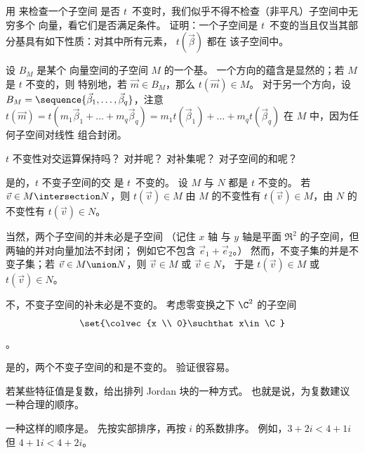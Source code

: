   \item 
    用  来检查一个子空间
    是否 $t$~不变时，我们似乎不得不检查（非平凡）子空间中无穷多个
    向量，看它们是否满足条件。
    证明：一个子空间是 \( t \)~不变的当且仅当其部分基具有如下性质：对其中所有元素，
    $t(\vec{\beta})$ 都在
    该子空间中。
    \begin{answer}
      设 \( B_M \) 是某个
      向量空间的子空间 \( M \) 的一个基。
      一个方向的蕴含是显然的；若 \( M \) 是 \( t \) 不变的，则
      特别地，若 \( \vec{m}\in B_M \)，那么 \( t(\vec{m})\in M \)。
      对于另一个方向，设
      \( B_M=\sequence{\vec{\beta}_1,\dots,\vec{\beta}_q} \)，注意
      \( t(\vec{m})=t(m_1\vec{\beta}_1+\dots+m_q\vec{\beta}_q)
                   =m_1t(\vec{\beta}_1)+\dots+m_qt(\vec{\beta}_q) \)
      在 \( M \) 中，因为任何子空间对线性
      组合封闭。 
    \end{answer}
  \recommended \item 
    \( t \) 不变性对交运算保持吗？
    对并呢？
    对补集呢？
    对子空间的和呢？
    \begin{answer}
      是的，$t$ 不变子空间的交
      是 $t$~不变的。
      设 \( M \) 与 \( N \) 都是 \( t \) 不变的。
      若 \( \vec{v}\in M\intersection N \)，则 \( t(\vec{v})\in M \) 
      由 \( M \) 的不变性有 \( t(\vec{v})\in M \)，由
      \( N \) 的不变性有 \( t(\vec{v})\in N \)。

      当然，两个子空间的并未必是子空间
      （记住 $x$ 轴\hbox{} 与 $y$ 轴是平面
      $\Re^2$ 的子空间，但两轴的并对向量加法不封闭；
      例如它不包含
      $\vec{e}_1+\vec{e}_2$。）
      然而，不变子集的并是不变子集；若
      \( \vec{v}\in M\union N \)，则 \( \vec{v}\in M \) 或 \( \vec{v}\in N \)，
      于是 \( t(\vec{v})\in M \) 或 \( t(\vec{v})\in N \)。

      不，不变子空间的补未必是不变的。
      考虑零变换之下 \( \C^2 \) 的子空间
      \begin{equation*}
        \set{\colvec{x \\ 0}\suchthat x\in\C}
      \end{equation*}
      。

      是的，两个不变子空间的和是不变的。
      验证很容易。  
    \end{answer}
  \item  \label{exer:OrderC}
     若某些特征值是复数，给出排列
     Jordan 块的一种方式。
     也就是说，为复数建议一种合理的顺序。
     \begin{answer}
       一种这样的顺序是。
       先按实部排序，再按 \( i \) 的系数排序。
       例如，\( 3+2i<4+1i \) 但 \( 4+1i<4+2i \)。  
     \end{answer}
